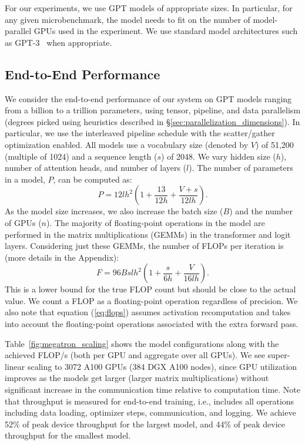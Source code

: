 For our experiments, we use GPT models of appropriate sizes. In particular, for any given microbenchmark, the model needs to fit on the number of model-parallel GPUs used in the experiment. We use standard model architectures such as GPT-3~\cite{gpt3} when appropriate.

\subsection{End-to-End Performance}

We consider the end-to-end performance of our system on GPT models ranging from a billion to a trillion parameters, using tensor, pipeline, and data parallelism (degrees picked using heuristics described in \S\ref{sec:parallelization_dimensions}). In particular, we use the interleaved pipeline schedule with the scatter/gather optimization enabled. All models use a vocabulary size (denoted by $V$) of 51,200 (multiple of 1024) and a sequence length ($s$) of 2048. We vary hidden size ($h$), number of attention heads, and number of layers ($l$). The number of parameters in a model, $P$, can be computed as:
\begin{equation}
  P = 12lh^2\left(1 + \dfrac{13}{12h}+\dfrac{V+s}{12lh}\right).
  \label{eq:num-params}
\end{equation}
As the model size increases, we also increase the batch size ($B$) and the number of GPUs ($n$). The majority of floating-point operations in the model are performed in the matrix multiplications (GEMMs) in the transformer and logit layers. Considering just these GEMMs, the number of FLOPs per iteration is (more details in the Appendix):
\begin{equation}
    F=96Bslh^2\left(1 + \dfrac{s}{6h} + \dfrac{V}{16lh}\right).
    \label{eq:flops}
\end{equation}
This is a lower bound for the true FLOP count but should be close to the actual value. We count a FLOP as a floating-point operation regardless of precision. We also note that equation (\ref{eq:flops}) assumes activation recomputation and takes into account the floating-point operations associated with the extra forward pass.

Table~\ref{fig:megatron_scaling} shows the model configurations along with the achieved FLOP/s (both per GPU and aggregate over all GPUs). We see super-linear scaling to 3072 A100 GPUs (384 DGX A100 nodes), since GPU utilization improves as the models get larger (larger matrix multiplications) without significant increase in the communication time relative to computation time. Note that throughput is measured for end-to-end training, i.e., includes all operations including data loading, optimizer steps, communication, and logging. We achieve 52\% of peak device throughput for the largest model, and 44\% of peak device throughput for the smallest model.


